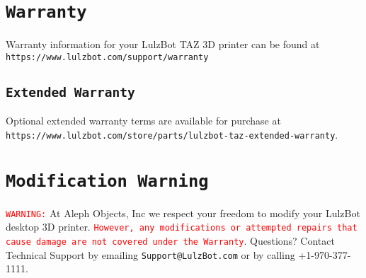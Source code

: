 %
%
%
%
%

\section{\texttt{Warranty}}
Warranty information for your LulzBot\textsuperscript{\miniscule{\textregistered}} TAZ 3D printer can be found at \texttt{https://www.lulzbot.com/support/warranty}

\subsection{\texttt{Extended Warranty}}
Optional extended warranty terms are available for purchase at \texttt{https://www.lulzbot.com/store/parts/lulzbot-taz-extended-warranty}.

\section{\texttt{Modification Warning}}
\textcolor{red}{\texttt{WARNING:}} At Aleph Objects, Inc\textsuperscript{\miniscule{\textregistered}} we respect your freedom to modify your LulzBot desktop 3D printer. \textcolor{red}{\texttt{However, any modifications or attempted repairs that cause damage are not covered under the Warranty}}. Questions? Contact Technical Support by emailing \texttt{Support@LulzBot.com} or by calling +1-970-377-1111.
